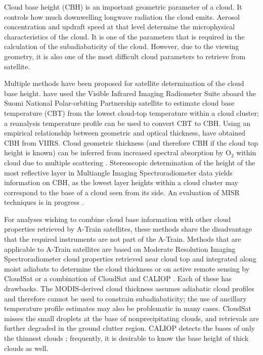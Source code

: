 \documentclass[essd,manuscript]{copernicus}\usepackage[]{graphicx}\usepackage[]{color}
\begin{document}
\introduction  %
\label{sec:intro}
Cloud base height (CBH) is an important geometric parameter of a cloud.  It
controls how much downwelling longwave radiation the cloud emits.  Aerosol
concentration and updraft speed at that level determine the microphysical
characteristics of the cloud.  It is one of the parameters that is required in
the calculation of the subadiabaticity of the cloud.  However, due to the
viewing geometry, it is also one of the most difficult cloud parameters to
retrieve from satellite.

Multiple methods have been proposed for satellite determination of the cloud
base height.  \cite{Zhu2014} have used the Visible Infrared Imaging Radiometer Suite
aboard the Suomi National Polar-orbiting Partnership satellite
\citep[VIIRS,][]{Cao2014} to estimate cloud base temperature (CBT) from the
lowest cloud-top temperature within a cloud cluster; a reanalysis temperature
profile can be used to convert CBT to CBH.  Using an empirical relationship
between geometric and optical thickness, \cite{Fitch2016} have obtained CBH from
VIIRS.  Cloud geometric thickness (and therefore CBH if the cloud top height is
known) can be inferred from increased spectral absorption by O$_2$ within cloud
due to multiple scattering \citep{Kokhanovsky2005}.  Stereoscopic determination of
the height of the most reflective layer \citep{Naud2005,Naud2007} in Multiangle
Imaging Spectroradiometer data \citep[MISR,][]{Diner1998} yields information on
CBH, as the lowest layer heights within a cloud cluster may correspond to the
base of a cloud seen from its side.  An evaluation of MISR
  techniques is in progress \citep{Boehm2017}.

For analyses wishing to combine cloud base information with other cloud
properties retrieved by A-Train satellites, these methods share the disadvantage
that the required instruments are not part of the A-Train.  Methods that are
applicable to A-Train satellites are based on Moderate Resolution Imaging
Spectroradiometer \citep[MODIS,][]{Platnick2017} cloud properties retrieved near
cloud top and integrated along moist adiabats to determine the cloud thickness
\citep{Meerkoetter2007} or on active remote sensing by CloudSat
\citep[2B-GEOPROF,][]{Marchand2008} or a combination of CloudSat and CALIOP
\citep[2B-GEOPROF-LIDAR,][]{Mace2014}.  Each of these has drawbacks.  The
MODIS-derived cloud thickness assumes adiabatic cloud profiles and therefore
cannot be used to constrain subadiabaticity; the use of ancillary temperature
profile estimates may also be problematic in many cases.  CloudSat misses the
small droplets at the base of nonprecipitating clouds, and retrievals are
further degraded in the ground clutter region.  CALIOP detects the bases of only
the thinnest clouds \citep[$\tau < 5$,][]{Mace2014}; frequently, it is desirable
to know the base height of thick clouds as well.
\end{document}
